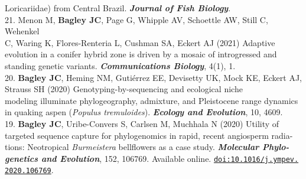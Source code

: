 \documentclass[margin,line]{res}
\begin{document}
\begin{resume}
\hspace*{8mm} Loricariidae) from Central Brazil. {\it \textbf{Journal of Fish Biology}}. \\
21. Menon M, \textbf{Bagley JC}, Page G, Whipple AV, Schoettle AW, Still C, Wehenkel\\
\hspace*{8mm} C, Waring K, Flores-Renteria L, Cushman SA, Eckert AJ (2021) Adaptive\\
\hspace*{8mm} evolution in a conifer hybrid zone is driven by a mosaic of introgressed and\\ \vspace{2mm}
\hspace*{8mm}standing genetic variants. {\it \textbf{Communications Biology}}, 4(1), 1. \\
20. \textbf{Bagley JC}, Heming NM, Guti\'{e}rrez EE, Devisetty UK, Mock KE, Eckert AJ,\\
\hspace*{8mm} Strauss SH (2020) Genotyping-by-sequencing and ecological niche \\
\hspace*{8mm} modeling illuminate phylogeography, admixture, and Pleistocene range dynamics\\ \vspace{2mm}
\hspace*{8mm}in quaking aspen (\textit{Populus tremuloides}). {\it \textbf{Ecology and Evolution}}, 10, 4609.\\
19. \textbf{Bagley JC}, Uribe-Convers S, Carlsen M, Muchhala N (2020) Utility of\\
\hspace*{8mm} targeted sequence capture for phylogenomics in rapid, recent angiosperm radia-\\
\hspace*{8mm} tions: Neotropical \emph{Burmeistera} bellflowers as a case study. \textit{\textbf{Molecular Phylo-}\\ 
\hspace*{8mm}\textbf{ genetics and Evolution}}, 152, 106769. Available online. 
\href{doi:10.1016/j.ympev.2020.106769}{\tt doi:10.1016/j.ympev.}\\
\vspace{2mm}
\hspace*{7mm} \href{doi:10.1016/j.ympev.2020.106769}{\tt2020.106769}.\\

\end{resume}
\end{document}
